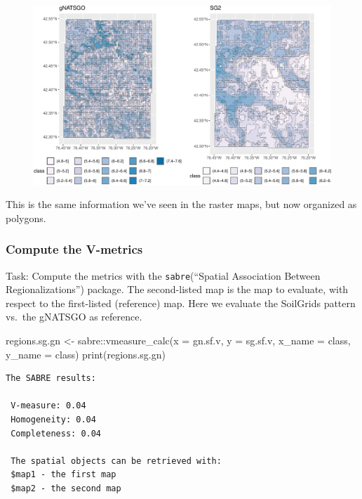 \documentclass[
  letterpaper,
  DIV=11,
  numbers=noendperiod]{scrartcl}
\newenvironment{Shaded}{\begin{snugshade}}{\end{snugshade}}
\newcommand{\AttributeTok}[1]{\textcolor[rgb]{0.40,0.45,0.13}{#1}}
\newcommand{\FunctionTok}[1]{\textcolor[rgb]{0.28,0.35,0.67}{#1}}
\newcommand{\NormalTok}[1]{\textcolor[rgb]{0.00,0.23,0.31}{#1}}
\newcommand{\OtherTok}[1]{\textcolor[rgb]{0.00,0.23,0.31}{#1}}
\newcommand{\SpecialCharTok}[1]{\textcolor[rgb]{0.37,0.37,0.37}{#1}}
\begin{document}
\begin{figure}[H]

{\centering \includegraphics{PatternAnalysisWorkshopTutorial_files/figure-pdf/make_class_maps-1.pdf}

}

\end{figure}

This is the same information we've seen in the raster maps, but now
organized as polygons.

\hypertarget{sec-vmeasure}{%
\subsubsection{Compute the V-metrics}\label{sec-vmeasure}}

Task: Compute the metrics with the \texttt{sabre}(``Spatial Association
Between Regionalizations'') package. The second-listed map is the map to
evaluate, with respect to the first-listed (reference) map. Here we
evaluate the SoilGrids pattern vs.~the gNATSGO as reference.

\begin{Shaded}
\begin{Highlighting}[]
\NormalTok{regions.sg.gn }\OtherTok{\textless{}{-}}\NormalTok{ sabre}\SpecialCharTok{::}\FunctionTok{vmeasure\_calc}\NormalTok{(}\AttributeTok{x =}\NormalTok{ gn.sf.v, }
                                 \AttributeTok{y =}\NormalTok{ sg.sf.v, }
                                 \AttributeTok{x\_name =}\NormalTok{ class, }\AttributeTok{y\_name =}\NormalTok{ class)}
\FunctionTok{print}\NormalTok{(regions.sg.gn)}
\end{Highlighting}
\end{Shaded}

\begin{verbatim}
The SABRE results:

 V-measure: 0.04 
 Homogeneity: 0.04 
 Completeness: 0.04 

 The spatial objects can be retrieved with:
 $map1 - the first map
 $map2 - the second map 
\end{verbatim}
\end{document}
